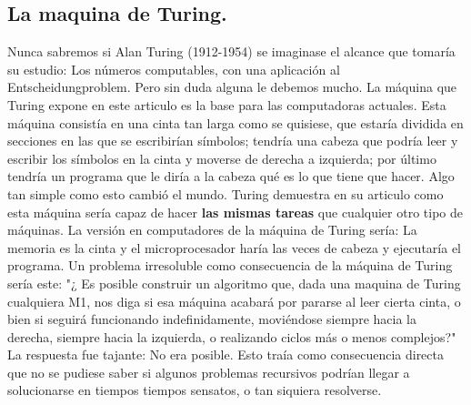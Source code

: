 \documentclass[conference,compsoc]{IEEEtran}
\begin{document}
\subsection {La maquina de Turing.}
Nunca sabremos si Alan Turing (1912-1954) se imaginase el alcance que tomaría su estudio: Los números computables, con una aplicación al Entscheidungproblem. Pero sin duda alguna le debemos mucho. La máquina que Turing expone en este articulo es la base para las computadoras actuales. Esta máquina consistía en una cinta tan larga como se quisiese, que estaría dividida en secciones en las que se escribirían símbolos; tendría una cabeza que podría leer y escribir los símbolos en la cinta y moverse de derecha a izquierda; por último tendría un programa que le diría a la cabeza qué es lo que tiene que hacer. Algo tan simple como esto cambió el mundo. Turing demuestra en su articulo como esta máquina sería capaz de hacer \textbf{las mismas tareas} que cualquier otro tipo de máquinas.
\newline
La versión en computadores de la máquina de Turing sería: La memoria es la cinta y el microprocesador haría las veces de cabeza y ejecutaría el programa.
\newline
Un problema irresoluble como consecuencia de la máquina de Turing sería este:
\newline
"¿ Es posible construir un algoritmo que, dada una maquina de Turing cualquiera M1, nos diga si esa máquina acabará por pararse al leer cierta cinta, o bien si seguirá funcionando indefinidamente, moviéndose siempre hacia la derecha, siempre hacia la izquierda, o realizando ciclos más o menos complejos?"\cite{Alfonseca}
\newline
La respuesta fue tajante: No era posible. Esto traía como consecuencia directa que no se pudiese saber si algunos problemas recursivos podrían llegar a solucionarse en tiempos tiempos sensatos, o tan siquiera resolverse.
\end{document}
